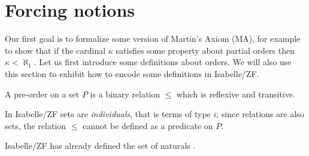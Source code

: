 \section{Forcing notions}\label{sec:forcing-posets}

Our first goal is to formalize some version of Martin's Axiom (MA), for
example to show that if the cardinal $\kappa$ satisfies some property
about partial orders then $\kappa < \aleph_1$. Let us first introduce
some definitions about orders. We will also use this section to exhibit
how to encode some definitions in Isabelle/ZF.

\begin{definition}
  A pre-order on a set $P$ is a binary relation $\leqslant$ which is
  reflexive and transitive.
\end{definition}

In Isabelle/ZF sets are \emph{individuals}, that is terms of type $i$; since
relations are also sets, the relation $\leqslant$ cannot be defined as
a predicate on $P$.

\begin{example}
  Isabelle/ZF has already defined the set of naturals .
\end{example}



